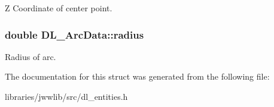 Z Coordinate of center point. \hypertarget{structDL__ArcData_aaf24d5d27c478fcb956781d758d34b31}{
\subsubsection[{radius}]{\setlength{\rightskip}{0pt plus 5cm}double D\-L\-\_\-\-Arc\-Data\-::radius}}\label{structDL__ArcData_aaf24d5d27c478fcb956781d758d34b31}
Radius of arc. 

The documentation for this struct was generated from the following file\-:\begin{DoxyCompactItemize}
\item 
libraries/jwwlib/src/dl\-\_\-entities.\-h\end{DoxyCompactItemize}
